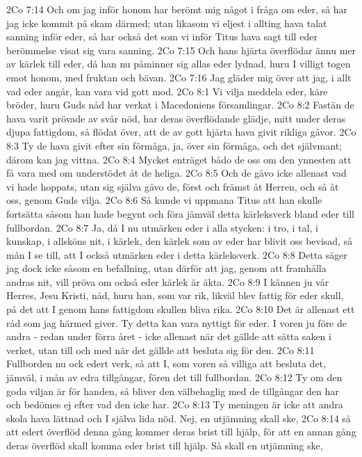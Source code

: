2Co 7:14  Och om jag inför honom har berömt mig något i fråga om eder, så har jag icke kommit på skam därmed; utan likasom vi eljest i allting hava talat sanning inför eder, så har också det som vi inför Titus hava sagt till eder berömmelse visat sig vara sanning.
2Co 7:15  Och hans hjärta överflödar ännu mer av kärlek till eder, då han nu påminner sig allas eder lydnad, huru I villigt togen emot honom, med fruktan och bävan.
2Co 7:16  Jag gläder mig över att jag, i allt vad eder angår, kan vara vid gott mod.
2Co 8:1  Vi vilja meddela eder, käre bröder, huru Guds nåd har verkat i Macedoniens församlingar.
2Co 8:2  Fastän de hava varit prövade av svår nöd, har deras överflödande glädje, mitt under deras djupa fattigdom, så flödat över, att de av gott hjärta hava givit rikliga gåvor.
2Co 8:3  Ty de hava givit efter sin förmåga, ja, över sin förmåga, och det självmant; därom kan jag vittna.
2Co 8:4  Mycket enträget bådo de oss om den ynnesten att få vara med om understödet åt de heliga.
2Co 8:5  Och de gåvo icke allenast vad vi hade hoppats, utan sig själva gåvo de, först och främst åt Herren, och så åt oss, genom Guds vilja.
2Co 8:6  Så kunde vi uppmana Titus att han skulle fortsätta såsom han hade begynt och föra jämväl detta kärleksverk bland eder till fullbordan.
2Co 8:7  Ja, då I nu utmärken eder i alla stycken: i tro, i tal, i kunskap, i allsköns nit, i kärlek, den kärlek som av eder har blivit oss bevisad, så mån I se till, att I också utmärken eder i detta kärleksverk.
2Co 8:8  Detta säger jag dock icke såsom en befallning, utan därför att jag, genom att framhålla andras nit, vill pröva om också eder kärlek är äkta.
2Co 8:9  I kännen ju vår Herres, Jesu Kristi, nåd, huru han, som var rik, likväl blev fattig för eder skull, på det att I genom hans fattigdom skullen bliva rika.
2Co 8:10  Det är allenast ett råd som jag härmed giver. Ty detta kan vara nyttigt för eder. I voren ju före de andra - redan under förra året - icke allenast när det gällde att sätta saken i verket, utan till och med när det gällde att besluta sig för den.
2Co 8:11  Fullborden nu ock edert verk, så att I, som voren så villiga att besluta det, jämväl, i mån av edra tillgångar, fören det till fullbordan.
2Co 8:12  Ty om den goda viljan är för handen, så bliver den välbehaglig med de tillgångar den har och bedömes ej efter vad den icke har.
2Co 8:13  Ty meningen är icke att andra skola hava lättnad och I själva lida nöd. Nej, en utjämning skall ske,
2Co 8:14  så att edert överflöd denna gång kommer deras brist till hjälp, för att en annan gång deras överflöd skall komma eder brist till hjälp. Så skall en utjämning ske,

